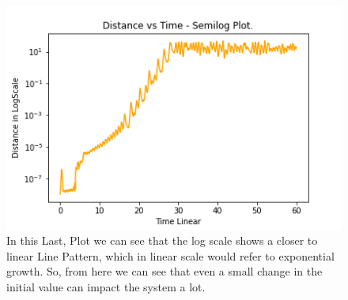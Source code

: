 \documentclass{article}
\begin{document}
\begin{figure}[!htb]
  \centering
  \includegraphics[width=1\linewidth]{q2_3.png}
  \caption{In this Last, Plot we can see that the log scale shows a closer to linear Line Pattern, which in linear scale would refer to exponential growth. So, from here we can see that even a small change in the initial value can impact the system a lot. }
  \label{fig:q2_3.png}
\end{figure}
\end{document}
